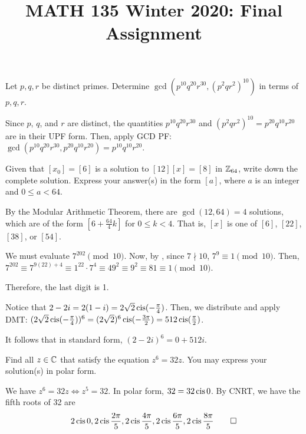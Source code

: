 
\title{MATH 135 Winter 2020: Final Assignment}


\thispagestyle{firstpage}
\textbf{\@title}

\begin{prob}
  Let $p,q,r$ be distinct primes.
  Determine $\gcd(p^{10}q^{20}r^{30},(p^2qr^2)^{10})$ in terms of $p,q,r$.
\end{prob}
\begin{sol}
  Since $p$, $q$, and $r$ are distinct, the quantities $p^{10}q^{20}r^{30}$
  and $(p^2qr^2)^{10} = p^{20}q^{10}r^{20}$ are in their UPF form.
  Then, apply GCD PF\@: $\gcd(p^{10}q^{20}r^{30},p^{20}q^{10}r^{20}) = p^{10}q^{10}r^{20}$.
\end{sol}

\begin{prob}
  Given that $[x_0] = [6]$ is a solution to $[12][x] = [8]$ in $\mathbb{Z}_{64}$, write down the complete solution.
  Express your answer(s) in the form $[a]$, where $a$ is an integer and $0 \leq a < 64$.
\end{prob}
\begin{sol}
  By the Modular Arithmetic Theorem, there are $\gcd(12,64) = 4$ solutions,
  which are of the form $[6+\frac{64}{4}k]$ for $0 \leq k < 4$.
  That is, $[x]$ is one of $[6]$, $[22]$, $[38]$, or $[54]$.
\end{sol}

\begin{sol}
  We must evaluate $7^{202} \pmod{10}$.
  Now, by \FLT, since $7 \nmid 10$, $7^9 \equiv 1 \pmod {10}$.
  Then, $7^{202} \equiv 7^{9(22) + 4} \equiv 1^{22} \cdot 7^4 \equiv 49^2 \equiv 9^2 \equiv 81 \equiv 1 \pmod{10}$.

  Therefore, the last digit is 1.
\end{sol}

\begin{sol}
  Notice that $2-2i = 2(1-i) = 2\sqrt{2}\operatorname{cis}(-\frac\pi4)$.
  Then, we distribute and apply DMT\@: $(2\sqrt{2}\operatorname{cis}(-\frac\pi4))^6 = (2\sqrt{2})^6\operatorname{cis}(-\frac{3\pi}{2}) = 512\operatorname{cis}(\frac{\pi}{2})$.

  It follows that in standard form, $(2-2i)^6 = 0 + 512i$.
\end{sol}

\begin{prob}
  Find all $z\in\mathbb{C}$ that satisfy the equation $z^6 = 32z$.
  You may express your solution(s) in polar form.
\end{prob}
\begin{sol}
  We have $z^6 = 32z \iff z^5 = 32$.
  In polar form, $32 = 32 \operatorname{cis} 0$.
  By CNRT, we have the fifth roots of 32 are
  \[ 2\operatorname{cis} 0, 2\operatorname{cis}\frac{2\pi}{5}, 2\operatorname{cis}\frac{4\pi}{5}, 2\operatorname{cis}\frac{6\pi}{5}, 2\operatorname{cis}\frac{8\pi}{5} \qedhere \]
\end{sol}

